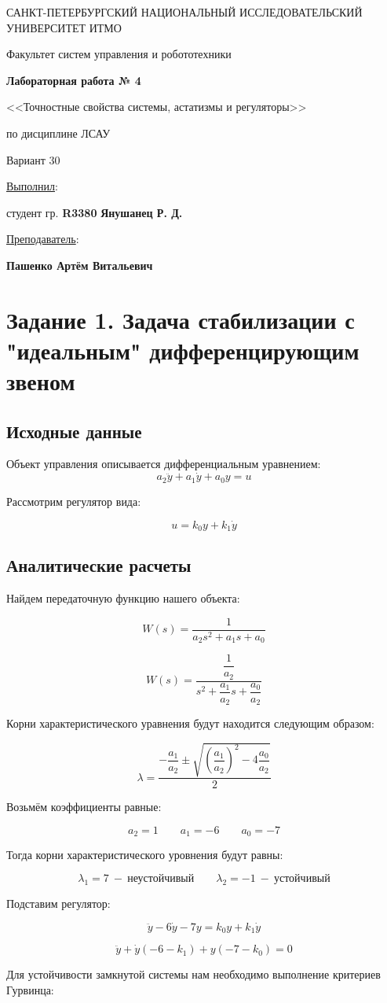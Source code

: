 \documentclass[a5paper, 10pt]{article}
\theoremstyle{definition}
\theoremstyle{plain}
\theoremstyle{remark}
\newcommand*{\titlePage}{
	\thispagestyle{title}
	\begingroup
	\begin{center}
		\vspace*{6ex}
		
		{\small
			САНКТ-ПЕТЕРБУРГСКИЙ НАЦИОНАЛЬНЫЙ ИССЛЕДОВАТЕЛЬСКИЙ УНИВЕРСИТЕТ ИТМО	
		}
		
		\vspace*{2ex}
		
		{\normalsize
			Факультет систем управления и робототехники
		}
		
		\vspace*{15ex}
		
		{\Large \bfseries 
			Лабораторная работа № 4
		}
\vspace*{2ex}
	{\Large \bfseries 
			
<<Точностные свойства системы, астатизмы и регуляторы>>
		}
\vspace*{2ex}
		
		{\normalsize
			по дисциплине ЛСАУ
		}
\vspace*{2ex}
	{\Large \bfseries 
			
Вариант 30
		}

	\end{center}
	\vspace*{8ex}
	\begin{flushright}
		{\large 
			\underline{Выполнил}:\\
			\begin{flushright}
				студент гр. \textbf{R3380} \textbf{Янушанец Р. Д.}\\
			\end{flushright}
		}
		
		\vspace*{6ex}
		
		{\large 
			\underline{Преподаватель}:\\
            \begin{flushright}
            \textbf{Пашенко Артём Витальевич}
            \end{flushright}
		}
	\end{flushright}
	\newpage
	\setcounter{page}{1}
	\endgroup}
\begin{document}
	\titlePage
	\pagestyle{style}
\newpage

\tableofcontents

\newpage

\section{Задание 1. Задача стабилизации с "идеальным" дифференцирующим звеном}

\subsection{Исходные данные}
Объект управления описывается дифференциальным уравнением:
\begin{equation} \label{eq:object}
a_2\ddot{y} + a_1\dot{y} + a_0y = u
\end{equation}

Рассмотрим регулятор вида:

\begin{equation} \label{eq:regulator}
    u = k_0 y + k_1 \dot{y}
    \end{equation}


\subsection{Аналитические расчеты}

Найдем передаточную функцию нашего объекта:

$$
W(s)=\dfrac{1}{a_2s^2+a_1s+a_0}
$$

$$
W(s)=\dfrac{\dfrac{1}{a_2}}{s^2+\dfrac{a_1}{a_2}s+\dfrac{a_0}{a_2}}
$$

Корни характеристического уравнения будут находится следующим образом:

$$
\lambda=\dfrac{-\dfrac{a_1}{a_2}\pm\sqrt{\left(\dfrac{a_1}{a_2}\right)^2-4\dfrac{a_0}{a_2}}}{2}
$$

Возьмём коэффициенты равные:

$$
a_2=1 \qquad a_1 = - 6 \qquad a_0 = -7 
$$

Тогда корни характеристического уровнения будут равны:

$$
\lambda_1=7 \ - \ \textbf{неустойчивый} \qquad \lambda_2=-1 \ - \ \textbf{устойчивый}
$$

Подставим регулятор:

$$
\ddot{y} - 6\dot{y} - 7y = k_0 y + k_1 \dot{y}
$$

$$
\ddot{y}+\dot{y}(-6-k_1)+y(-7-k_0)=0
$$

Для устойчивости замкнутой системы нам необходимо выполнение критериев Гурвинца:
\end{document}
